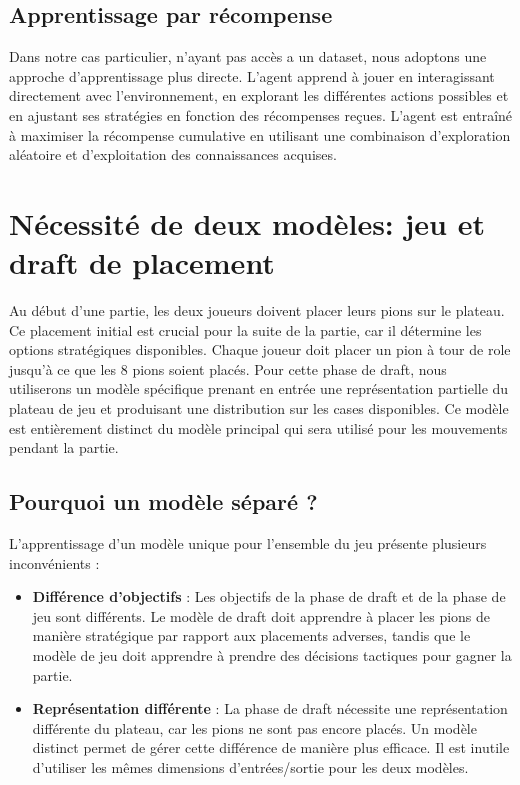\documentclass[]{article}
\begin{document}
\subsection{Apprentissage par récompense}
Dans notre cas particulier, n'ayant pas accès a un dataset, nous adoptons une approche d'apprentissage plus directe. L'agent apprend à jouer en interagissant directement avec l'environnement, en explorant les différentes actions possibles et en ajustant ses stratégies en fonction des récompenses reçues. L'agent est entraîné à maximiser la récompense cumulative en utilisant une combinaison d'exploration aléatoire et d'exploitation des connaissances acquises.

\section{Nécessité de deux modèles: jeu et draft de placement}
Au début d'une partie, les deux joueurs doivent placer leurs pions sur le plateau. Ce placement initial est crucial pour la suite de la partie, car il détermine les options stratégiques disponibles. Chaque joueur doit placer un pion à tour de role jusqu'à ce que les 8 pions soient placés. Pour cette phase de draft, nous utiliserons un modèle spécifique prenant en entrée une représentation partielle du plateau de jeu et produisant une distribution sur les cases disponibles. Ce modèle est entièrement distinct du modèle principal qui sera utilisé pour les mouvements pendant la partie.

\subsection{Pourquoi un modèle séparé ?}
L'apprentissage d'un modèle unique pour l'ensemble du jeu présente plusieurs inconvénients :
\begin{itemize}
    \item \textbf{Différence d'objectifs} : Les objectifs de la phase de draft et de la phase de jeu sont différents. Le modèle de draft doit apprendre à placer les pions de manière stratégique par rapport aux placements adverses, tandis que le modèle de jeu doit apprendre à prendre des décisions tactiques pour gagner la partie.
    \item \textbf{Représentation différente} : La phase de draft nécessite une représentation différente du plateau, car les pions ne sont pas encore placés. Un modèle distinct permet de gérer cette différence de manière plus efficace. Il est inutile d'utiliser les mêmes dimensions d'entrées/sortie pour les deux modèles.
\end{itemize}
\end{document}
